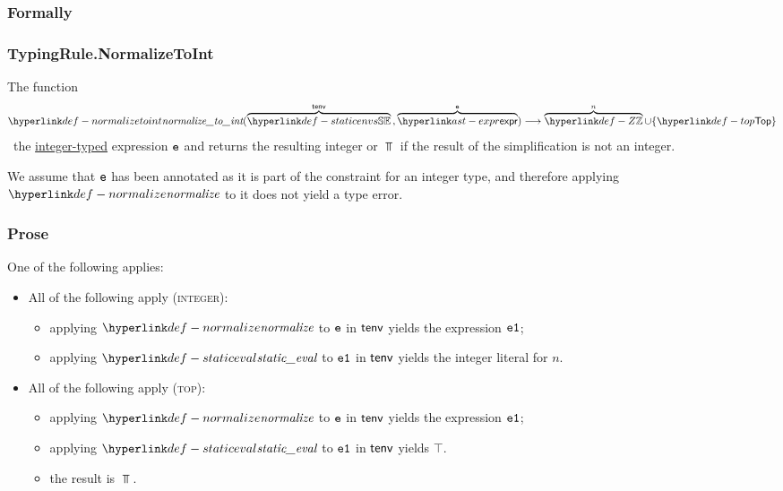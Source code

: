 \subsubsection{Formally}

\subsubsection{TypingRule.NormalizeToInt \label{sec:TypingRule.NormalizeToInt}}
\hypertarget{def-normalizetoint}{}
The function
\[
\normalizetoint(
  \overname{\staticenvs}{\tenv} \aslsep
  \overname{\expr}{\ve}
) \aslto \overname{\Z}{n} \cup \{\Top\}
\]
\symbolicallysimplifies\ the \underline{integer-typed} expression $\texttt{e}$ and returns the resulting integer or $\Top$ if
the result of the simplification is not an integer.

We assume that $\texttt{e}$ has been annotated as it is part of the constraint for an integer type,
and therefore applying $\normalize$ to it does not yield a type error.

\subsubsection{Prose}
One of the following applies:
\begin{itemize}
  \item All of the following apply (\textsc{integer}):
  \begin{itemize}
    \item applying $\normalize$ to $\texttt{e}$ in $\textsf{tenv}$ yields the expression $\texttt{e1}$;
    \item applying $\staticeval$ to $\texttt{e1}$ in $\textsf{tenv}$ yields the integer literal for $n$.
  \end{itemize}

  \item All of the following apply (\textsc{top}):
  \begin{itemize}
    \item applying $\normalize$ to $\texttt{e}$ in $\textsf{tenv}$ yields the expression $\texttt{e1}$;
    \item applying $\staticeval$ to $\texttt{e1}$ in $\textsf{tenv}$ yields $\top$.
    \item the result is $\Top$.
  \end{itemize}
\end{itemize}

